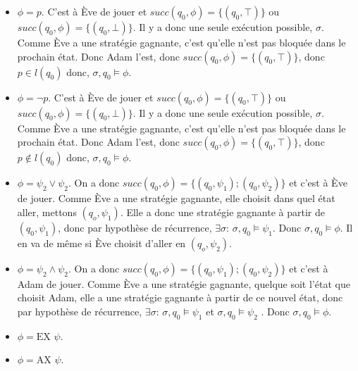 \documentclass[10pt,a4paper]{article}
\begin{document}
\begin{itemize}
\item $\phi = p$. C'est à Ève de jouer et $succ(q_0,\phi) = \{(q_0, \top)\}$ ou $succ(q_0,\phi) = \{(q_0, \bot)\}$. Il y a donc une seule exécution possible, $\sigma$. Comme Ève a une stratégie gagnante, c'est qu'elle n'est pas bloquée dans le prochain état. Donc Adam l'est, donc $succ(q_0,\phi) = \{(q_0, \top)\}$, donc $p \in l(q_0)$ donc, $\sigma,q_0 \vDash \phi$.
\item $\phi = \neg p$. C'est à Ève de jouer et $succ(q_0,\phi) = \{(q_0, \top)\}$ ou $succ(q_0,\phi) = \{(q_0, \bot)\}$. Il y a donc une seule exécution possible, $\sigma$. Comme Ève a une stratégie gagnante, c'est qu'elle n'est pas bloquée dans le prochain état. Donc Adam l'est, donc $succ(q_0,\phi) = \{(q_0, \top)\}$, donc $p \notin l(q_0)$ donc, $\sigma,q_0 \vDash \phi$.
\item $\phi = \psi_2 \lor \psi_2$. On a donc $succ(q_0,\phi) = \{(q_0, \psi_1); (q_0, \psi_2) \}$ et c'est à Ève de jouer. Comme Ève a une stratégie gagnante, elle choisit dans quel état aller, mettons $(q_o, \psi_1)$. Elle a donc une stratégie gagnante à partir de $(q_0, \psi_1)$, donc par hypothèse de récurrence, $\exists \sigma$: $\sigma,q_0 \vDash \psi_1$. Donc $\sigma,q_0 \vDash \phi$. Il en va de même si Ève choisit d'aller en $(q_o, \psi_2)$.
\item $\phi = \psi_2 \land \psi_2$. On a donc $succ(q_0,\phi) = \{(q_0, \psi_1); (q_0, \psi_2) \}$ et c'est à Adam de jouer. Comme Ève a une stratégie gagnante, quelque soit l'état que choisit Adam, elle a une stratégie gagnante à partir de ce nouvel état, donc par hypothèse de récurrence, $\exists \sigma$: $\sigma,q_0 \vDash \psi_1$ et $\sigma,q_0 \vDash \psi_2$ . Donc $\sigma,q_0 \vDash \phi$.
\item $\phi = \mbox{EX } \psi$.
\item $\phi = \mbox{AX } \psi$.
\end{itemize}
\end{document}
